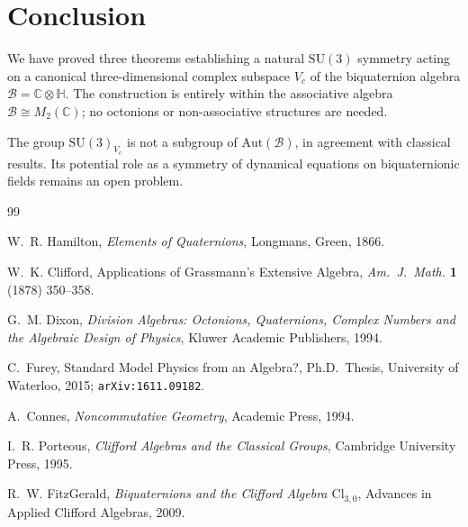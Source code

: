 \documentclass[12pt,a4paper]{article}
\theoremstyle{remark}
\newcommand{\B}{\mathcal{B}}          %
\newcommand{\C}{\mathbb{C}}
\newcommand{\H}{\mathbb{H}}
\begin{document}
\section{Conclusion}
\label{sec:conclusion}

We have proved three theorems establishing a natural $\mathrm{SU}(3)$
symmetry acting on a canonical three-dimensional complex subspace $V_c$ of
the biquaternion algebra $\B = \C\otimes\H$.  The construction is entirely
within the associative algebra $\B\cong M_2(\C)$; no octonions or
non-associative structures are needed.

The group $\mathrm{SU}(3)_{V_c}$ is not a subgroup of $\mathrm{Aut}(\B)$, in
agreement with classical results.  Its potential role as a symmetry of
dynamical equations on biquaternionic fields remains an open problem.

\begin{thebibliography}{99}

W.~R. Hamilton,
\emph{Elements of Quaternions},
Longmans, Green, 1866.

W.~K. Clifford,
Applications of Grassmann's Extensive Algebra,
\emph{Am.\ J.\ Math.} \textbf{1} (1878) 350--358.

G.~M. Dixon,
\emph{Division Algebras: Octonions, Quaternions, Complex Numbers and the
Algebraic Design of Physics},
Kluwer Academic Publishers, 1994.

C.~Furey,
Standard Model Physics from an Algebra?,
Ph.D.\ Thesis, University of Waterloo, 2015; \texttt{arXiv:1611.09182}.

A.~Connes,
\emph{Noncommutative Geometry},
Academic Press, 1994.

I.~R. Porteous,
\emph{Clifford Algebras and the Classical Groups},
Cambridge University Press, 1995.

R.~W. FitzGerald,
\emph{Biquaternions and the Clifford Algebra $\mathrm{Cl}_{3,0}$},
Advances in Applied Clifford Algebras, 2009.

\end{thebibliography}
\end{document}
